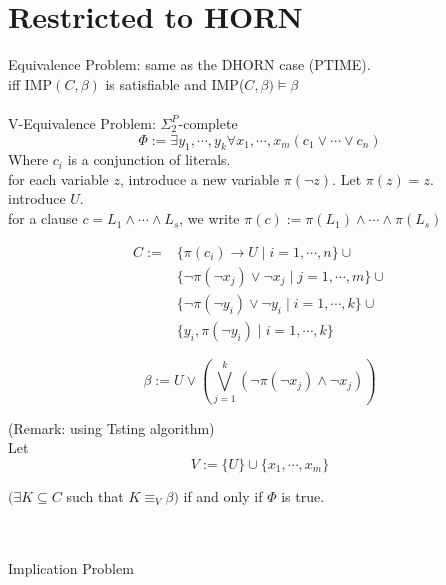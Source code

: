 \documentclass[12pt]{article}
\begin{document}
\section{Restricted to HORN}


Equivalence Problem: same as the DHORN case (PTIME).\\

iff IMP$(C,\beta)$ is satisfiable and IMP($C,\beta)\models \beta$\\ 

\ \\

V-Equivalence Problem:  $\Sigma_2^P$-complete\\ 


$$\Phi:=\exists y_1,\cdots, y_k \forall x_1,\cdots, x_m \left(c_1\vee\cdots\vee c_n \right)$$
%
Where $c_i$ is a conjunction of literals.\\

for each variable $z$, introduce a new variable $\pi(\neg z)$. Let $\pi(z)=z$.\\

introduce $U$.\\

for a clause $c=L_1\wedge\cdots\wedge L_s$, we write 
$\pi(c):=\pi(L_1)\wedge\cdots\wedge \pi(L_s)$





$$\begin{array}{ll}C:=&\{\pi(c_i)\rightarrow U\mid i=1,\cdots,n\}\cup\\ 
&\{\neg \pi(\neg x_j)\vee \neg x_j\mid j=1,\cdots,m\}\cup\\

&\{\neg \pi(\neg y_i)\vee \neg y_i\mid i=1,\cdots, k\}\cup\\
&\{y_i,\pi(\neg y_i)\mid i=1,\cdots,k\}\end{array}$$


$$\beta:= U\vee \left(\bigvee_{j=1}^k (\neg \pi(\neg x_j)\wedge \neg x_j)\right)$$


(Remark: using Tsting algorithm) \\

Let $$V:=\{U\}\cup\{x_1,\cdots,x_m\}$$

$(\exists K\subseteq C$ such that $K\equiv_V \beta)$ if and only if $\Phi$ is true.

\ \\

\ \\

Implication Problem
\end{document}
